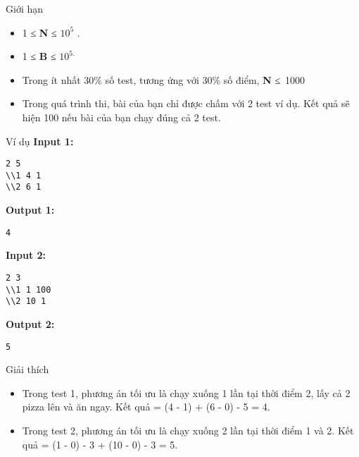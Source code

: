 Giới hạn  
\begin{itemize}
	\item     1         ≤     \textbf{      N     }      ≤ $10^{5}$      .     
	\item     1 ≤    \textbf{     B    }    ≤ $10^{5.}$
	\item     Trong ít nhất 30\% số test, tương ứng với 30\% số điểm,    \textbf{     N    }    ≤ 1000   
	\item     Trong quá trình thi, bài của bạn chỉ được chấm với 2 test ví dụ. Kết quả sẽ hiện 100 nếu bài của bạn chạy đúng cả 2 test.   
\end{itemize}
   Ví dụ  
\textbf{    Input 1:   }
\begin{verbatim}
2 5
\\1 4 1
\\2 6 1\end{verbatim}

\textbf{    Output 1:   }
\begin{verbatim}
4\end{verbatim}

\textbf{    Input 2:   }
\begin{verbatim}
2 3
\\1 1 100
\\2 10 1\end{verbatim}

\textbf{    Output 2:   }
\begin{verbatim}
5\end{verbatim}
   Giải thích  
\begin{itemize}
	\item     Trong test 1, phương án tối ưu là chạy xuống 1 lần tại thời điểm 2, lấy cả 2 pizza lên và ăn ngay. Kết quả = (4 - 1) + (6 - 0) - 5 = 4.   
	\item     Trong test 2, phương án tối ưu là chạy xuống 2 lần tại thời điểm 1 và 2. Kết quả = (1 - 0) - 3 + (10 - 0) - 3 = 5.   
\end{itemize}